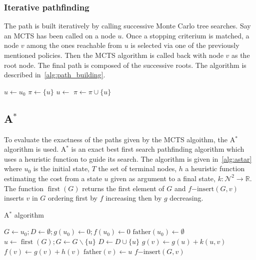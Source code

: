 \documentclass[oneside,twocolumn]{article}
\DeclareMathOperator{\argmax}{argmax}
\DeclareMathOperator{\first}{first}
\begin{document}
\subsubsection{Iterative pathfinding}
The path is built iteratively by calling successive Monte Carlo tree searches.
Say an MCTS has been called on a node \(u\). Once a stopping criterium is
matched, a node \(v\) among the ones reachable from \(u\) is selected via one of
the previously mentioned policies. Then the MCTS algorithm is called back with
node \(v\)
as the root node. The final path is composed of the successive roots. The
algorithm is described in~\ref{alg:path_building}.
\begin{algorithm}
  \caption{%
    Path building. The {\sc NextNode} (here max-child) function is one among
    those in~\ref{sssec:node_selection}.
  }\label{alg:path_building}
  \begin{algorithmic}
    \State{}\(u \gets u_0\)
    \State{}\(\pi \gets \{u\}\)
      \State{}
      \State{}\(u \gets\)
      \State{}\(\pi \gets \pi \cup \{u\}\)
    \EndFor{}
    \State{}\Return{$\pi$}
    \EndFunction{}
    \State{}\Return{$\argmax\{\mu_v | v \text{\,children of\,} u\}$}
    \EndFunction{}
  \end{algorithmic}
\end{algorithm}
\subsection{A\(^*\)}
To evaluate the exactness of the paths given by the MCTS algoithm, the A\(^*\)
algorithm is used. A\(^*\) is an exact best first search pathfinding algorithm
which uses a heuristic function to guide its search. The algorithm is given
in~\ref{alg:astar} where \(u_0\) is the initial state, \(T\) the set of terminal
nodes, \(h\) a heuristic function estimating the cost from a state \(u\) given
as argument to a final state, \(k \colon \mathcal{N}^2 \to \mathbb{R}\). The
function \(\first(G)\) returns the first element of \(G\) and
\(f\mathup{-insert}(G, v)\) inserts \(v\) in \(G\) ordering first by \(f\)
increasing then by \(g\) decreasing.
\begin{algorithm}
  \caption{A\(^*\) algorithm~\cite{alliotschiex2002ia&it}}\label{alg:astar}
  \begin{algorithmic}
    \State{}\(G \gets u_0; D \gets \emptyset; g(u_0) \gets 0; f(u_0) \gets 0\)
    \State{}\(\mathup{father}(u_0) \gets \emptyset\)
    \State{}\(u \gets \first(G); G \gets G \backslash \{u\}\)
    \State{}\(D \gets D \cup \{u\}\)
    \State{}
    \EndIf{}
    \State{}\(g(v) \gets g(u) + k(u, v)\)
    \State{}\(f(v) \gets g(v) + h(v)\)
    \State{}\(\mathup{father}(v) \gets u\)
    \State{}\(f\mathup{-insert}(G, v)\)
    \EndIf{}
    \EndFor{}
    \EndWhile{}
    \EndProcedure{}
  \end{algorithmic}
\end{algorithm}
\end{document}
